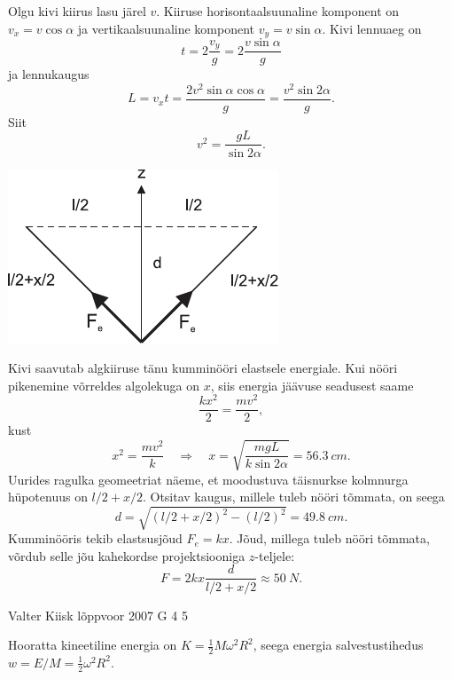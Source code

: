 \documentclass[11pt, twoside]{article}
\begin{document}
{{\ifSolution
Olgu kivi kiirus lasu järel $v$. Kiiruse horisontaalsuunaline komponent on $v_x = v \cos \alpha$ ja vertikaalsuunaline komponent $v_y = v \sin \alpha$. Kivi lennuaeg on
\[
t = 2 \frac{v_y}{g} = 2 \frac{v\sin\alpha}{g}
\]
ja lennukaugus
\[
L=v_{x} t=\frac{2 v^{2} \sin \alpha \cos \alpha}{g}=\frac{v^{2} \sin 2 \alpha}{g}.
\]
Siit
\[
v^2 = \frac{gL}{\sin 2\alpha}.
\]

\begin{center}
	\includegraphics[width=0.5\linewidth]{2006-v3g-03-lah}
\end{center}

Kivi saavutab algkiiruse tänu kumminööri elastsele energiale. Kui nööri pikenemine võrreldes algolekuga on $x$, siis energia jäävuse seadusest saame
\[
\frac{k x^{2}}{2}=\frac{m v^{2}}{2},
\]
kust
\[
x^{2}=\frac{m v^{2}}{k} \quad\Rightarrow\quad x=\sqrt{\frac{m g L}{k \sin 2 \alpha}}=\SI{56,3}{cm}.
\]
Uurides ragulka geomeetriat näeme, et moodustuva täisnurkse kolmnurga hüpotenuus on $l/2+x/2$. Otsitav kaugus, millele tuleb nööri tõmmata, on seega
\[
d=\sqrt{(l / 2+x / 2)^{2}-(l / 2)^{2}}=\SI{49,8}{cm}.
\]
Kumminööris tekib elastsusjõud $F_e = kx$. Jõud, millega tuleb nööri tõmmata, võrdub selle jõu kahekordse projektsiooniga $z$-teljele:
\[
F=2 k x \frac{d}{l / 2+x/2} \approx \SI{50}{N}.
\]
\fi
}

{Valter Kiisk} %
{lõppvoor} %
{2007} %
{G 4} %
{5} %
{

\ifSolution
\osa Hooratta kineetiline energia on $K = \frac{1}{2}M\omega^2R^2$, seega energia salvestustihedus $w = E/M = \frac{1}{2} \omega^2R^2$.

}}
\end{document}
